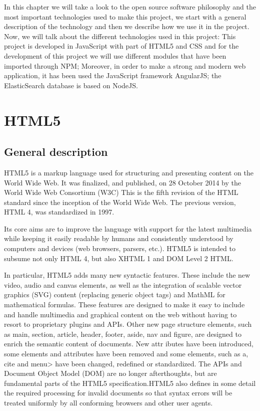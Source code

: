 \documentclass[a4paper, 12pt]{book}
\begin{document}
In this chapter we will take a look to the open source software philosophy and the most important technologies used to make this project, we start with a general description of the technology and then we describe how we use it in the project. Now, we will talk about the different technologies used in this project: This project is developed in JavaScript with part of HTML5 and CSS and for the development of this project we will use different modules that have been imported through NPM; Moreover, in order to make a strong and modern web application, it has been used the JavaScript framework AngularJS; the ElasticSearch database is based on NodeJS.

\section{HTML5}
\label{sec:html5}
\subsection{General description}
\label{sec:html5gd}
HTML5 is a markup language used for structuring and presenting content on the World Wide Web. It was finalized, and published, on 28 October 2014 by the World Wide Web Consortium (W3C) This is the fifth revision of the HTML standard since the inception of the World Wide Web. The previous version, HTML 4, was standardized in 1997.

Its core aims are to improve the language with support for the latest multimedia while keeping it easily readable by humans and consistently understood by computers and devices (web browsers, parsers, etc.). HTML5 is intended to subsume not only HTML 4, but also XHTML 1 and DOM Level 2 HTML.

In particular, HTML5 adds many new syntactic features. These include the new video, audio and canvas elements, as well as the integration of scalable vector graphics (SVG) content (replacing generic object tags) and MathML for mathematical formulas. These features are designed to make it easy to include and handle multimedia and graphical content on the web without having to resort to proprietary plugins and APIs. Other new page structure elements, such as main, section, article, header, footer, aside, nav and figure, are designed to enrich the semantic content of documents. New attr	ibutes have been introduced, some elements and attributes have been removed and some elements, such as a, cite and menu> have been changed, redefined or standardized. The APIs and Document Object Model (DOM) are no longer afterthoughts, but are fundamental parts of the HTML5 specification.HTML5 also defines in some detail the required processing for invalid documents so that syntax errors will be treated uniformly by all conforming browsers and other user agents.
\end{document}
